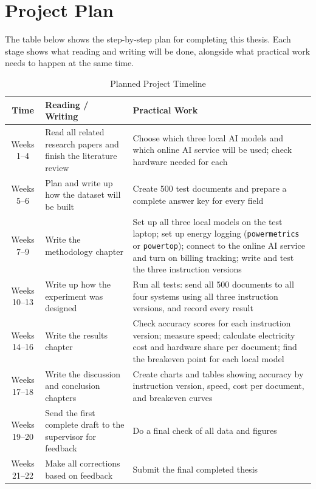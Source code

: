 \section{Project Plan}
\label{sec:plan}

The table below shows the step-by-step plan for completing this thesis. Each stage shows what reading and writing will be done, alongside what practical work needs to happen at the same time.

\begin{table}[h!]
    \centering
    \begin{tabularx}{\textwidth}{ | c | X | X | }
        \hline
        \textbf{Time} & \textbf{Reading / Writing} & \textbf{Practical Work} \\
        \hline
        Weeks 1--4   & Read all related research papers and finish the literature review & Choose which three local AI models and which online AI service will be used; check hardware needed for each \\
        \hline
        Weeks 5--6   & Plan and write up how the dataset will be built & Create 500 test documents and prepare a complete answer key for every field \\
        \hline
        Weeks 7--9   & Write the methodology chapter & Set up all three local models on the test laptop; set up energy logging (\texttt{powermetrics} or \texttt{powertop}); connect to the online AI service and turn on billing tracking; write and test the three instruction versions \\
        \hline
        Weeks 10--13 & Write up how the experiment was designed & Run all tests: send all 500 documents to all four systems using all three instruction versions, and record every result \\
        \hline
        Weeks 14--16 & Write the results chapter & Check accuracy scores for each instruction version; measure speed; calculate electricity cost and hardware share per document; find the breakeven point for each local model \\
        \hline
        Weeks 17--18 & Write the discussion and conclusion chapters & Create charts and tables showing accuracy by instruction version, speed, cost per document, and breakeven curves \\
        \hline
        Weeks 19--20 & Send the first complete draft to the supervisor for feedback & Do a final check of all data and figures \\
        \hline
        Weeks 21--22 & Make all corrections based on feedback & Submit the final completed thesis \\
        \hline
    \end{tabularx}
    \caption{Planned Project Timeline}
    \label{tab:timeline}
\end{table}

\newpage


